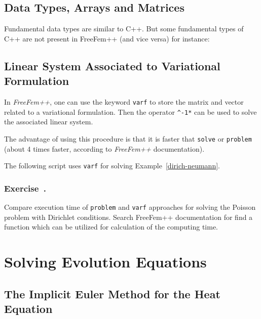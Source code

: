 \documentclass[12pt]{article}
\newcommand{\FF}{\textit{FreeFem++}\xspace}
\newcounter{exercise}
\newenvironment{exercise}{%
  \stepcounter{exercise}
  \subsubsection*{Exercise~\theexercise.}}
{}
\begin{document}
\subsection{Data Types, Arrays and Matrices}
\label{sec:data-types-arrays}

Fundamental data types are similar to C++. But some fundamental types of C++ are not present in FreeFem++ (and vice versa) for instance:


\subsection{Linear System Associated to Variational Formulation}
\label{part:line-syst-assoc}

In \FF, one can use the keyword \texttt{varf} to store the matrix and
vector related to a variational formulation. Then the operator \verb|^-1*|
can be used to solve the associated linear system.

The advantage of using this procedure is that it is faster that
\texttt{solve} or \texttt{problem} (about 4 times faster, according to
\FF documentation).

The following script uses \texttt{varf} for solving Example~\ref{dirich-neumann}.



\begin{exercise}
  Compare execution time of \texttt{problem} and \texttt{varf}
  approaches for solving the Poisson problem with Dirichlet
  conditions.  Search FreeFem++ documentation for find a function
  which can be utilized for calculation of the computing time.
\end{exercise}

\section{Solving Evolution Equations}
\label{sec:solv-evol-equat}

\subsection{The Implicit Euler Method for the Heat Equation}
\label{sec:heat-equation}
\newcommand{\deltaT}{\Delta t}
\end{document}
